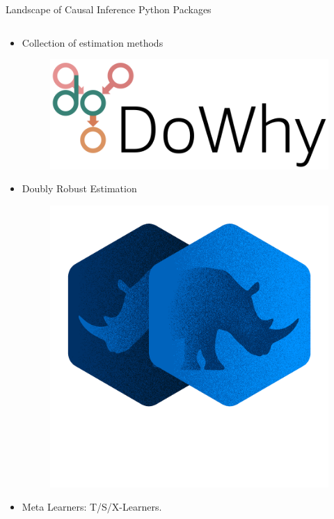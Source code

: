 \documentclass{beamer}
\begin{document}
\begin{frame}{Landscape of Causal Inference Python Packages}
	\begin{columns}
		\begin{column}[T]{0.55 \textwidth}
			\begin{itemize}
				\item Collection of estimation methods
					\begin{figure}
						\includegraphics[scale=0.2]{imgs/dowhy.png}
					\end{figure}
				\item Doubly Robust Estimation
					\begin{figure}
						\includegraphics[scale=0.1]{imgs/doubleml.png}
					\end{figure}
				\item Meta Learners: T/S/X-Learners.

\end{itemize}
\end{column}
\end{columns}
\end{frame}
\end{document}
